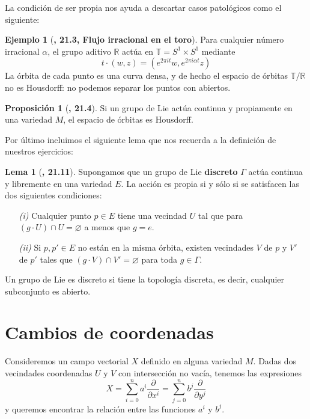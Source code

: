 \documentclass[spanish]{book}
\theoremstyle{definition}
\newtheorem*{prop}{Proposición}
\newtheorem*{lema}{Lema}
\newtheorem*{ejem}{Ejemplo}
\newcommand{\R}{\mathbb{R}}
\begin{document}
	La condición de ser propia nos ayuda a descartar casos patológicos como el siguiente:
	\begin{ejem}[\cite{Lee}\textbf{, 21.3, Flujo irracional en el toro}]
		Para cualquier número irracional $\alpha$, el grupo aditivo $\R$ actúa en $\mathbb{T}=S^1\times S^1$ mediante
		\[t\cdot (w,z)=(e^{2\pi it}w,e^{2\pi i\alpha t}z)\]
		La órbita de cada punto es una curva densa, y de hecho el espacio de órbitas $\mathbb{T}/\R$ no es Housdorff: no podemos separar los puntos con abiertos.
	\end{ejem}
	\begin{prop}[\cite{Lee}\textbf{, 21.4}]
		Si un grupo de Lie actúa continua y propiamente en una variedad $M$, el espacio de órbitas es Housdorff.
	\end{prop}
	Por último incluimos el siguiente lema que nos recuerda a la definición de nuestros ejercicios:
	\begin{lema}[\cite{Lee}\textbf{, 21.11}]
		Supongamos que un grupo de Lie \textbf{discreto} $\Gamma$ actúa continua y libremente en una variedad $E$. La acción es propia si y sólo si se satisfacen las dos siguientes condiciones:
		\begin{enumerate}
			\item [\textit{(i)}] Cualquier punto $p\in E$ tiene una vecindad $U$ tal que para $(g\cdot U)\cap U=\varnothing$ a menos que $g=e$.
			\item [\textit{(ii)}] Si $p, p'\in E$ no están en la misma órbita, existen vecindades $V$ de $p$ y $V'$ de $p'$ tales que $(g\cdot V)\cap V'=\varnothing$ para toda $g\in\Gamma$.
		\end{enumerate}
	\end{lema}
	Un grupo de Lie es discreto si tiene la topología discreta, es decir, cualquier subconjunto es abierto.
	\section{Cambios de coordenadas}
	Consideremos un campo vectorial $X$ definido en alguna variedad $M$. Dadas dos vecindades coordenadas $U$ y $V$ con intersección no vacía, tenemos las expresiones
	\[X=\sum_{i=0}^na^i\frac{\partial}{\partial x^i}=\sum_{j=0}^nb^j\frac{\partial}{\partial y^j}\]
	y queremos encontrar la relación entre las funciones $a^i$ y $b^j$.
	
\end{document}
